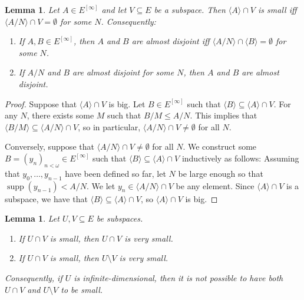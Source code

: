\documentclass[10pt,a4paper]{amsart}
\theoremstyle{plain}
\numberwithin{equation}{section}
\newtheorem{lemma}[theorem]{Lemma}
\theoremstyle{definition}
\newcommand{\func}{\operatorname}
\renewcommand{\c}[1]{\langle #1 \rangle}
\newcommand{\supp}{\func{supp}}
\begin{document}
\begin{lemma}
\label{lem:ad.iff.tail.disjoint}
    Let $A \in E^{[\infty]}$ and let $V \subseteq E$ be a subspace. Then $\c{A} \cap V$ is small iff $\c{A/N} \cap V = \emptyset$ for some $N$. Consequently:
    \begin{enumerate}
        \item If $A,B \in E^{[\infty]}$, then $A$ and $B$ are almost disjoint iff $\c{A/N} \cap \c{B} = \emptyset$ for some $N$.

        \item If $A/N$ and $B$ are almost disjoint for some $N$, then $A$ and $B$ are almost disjoint.
    \end{enumerate}
\end{lemma}

\begin{proof}
    Suppose that $\c{A} \cap V$ is big. Let $B \in E^{[\infty]}$ such that $\c{B} \subseteq \c{A} \cap V$. For any $N$, there exists some $M$ such that $B/M \leq A/N$. This implies that $\c{B/M} \subseteq \c{A/N} \cap V$, so in particular, $\c{A/N} \cap V \neq \emptyset$ for all $N$.

    Conversely, suppose that $\c{A/N} \cap V \neq \emptyset$ for all $N$. We construct some $B = (y_n)_{n<\omega} \in E^{[\infty]}$ such that $\c{B} \subseteq \c{A} \cap V$ inductively as follows: Assuming that $y_0,\dots,y_{n-1}$ have been defined so far, let $N$ be large enough so that $\supp(y_{n-1}) < A/N$. We let $y_n \in \c{A/N} \cap V$ be any element. Since $\c{A} \cap V$ is a subspace, we have that $\c{B} \subseteq \c{A} \cap V$, so $\c{A} \cap V$ is big.
\end{proof}

\begin{lemma}
\label{lem:ad.is.very.small}
    Let $U,V \subseteq E$ be subspaces.
    \begin{enumerate}
        \item If $U \cap V$ is small, then $U \cap V$ is very small.

        \item If $U \cap V$ is small, then $U \setminus V$ is very small.
    \end{enumerate}
    Consequently, if $U$ is infinite-dimensional, then it is not possible to have both $U \cap V$ and $U \setminus V$ to be small.
\end{lemma}
\end{document}
